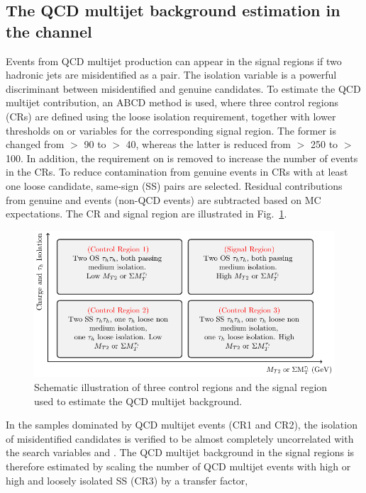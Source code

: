 \subsection{\texorpdfstring{The QCD multijet background estimation in the \tauTau channel}{The QCD multijet background estimation in the tau-tau channel}}
\label{sect:bkgQCD}
Events from QCD multijet production can appear in the signal regions if two hadronic jets are misidentified as a \tauTau pair.
The isolation variable is a powerful discriminant between misidentified and genuine \Tau candidates. To estimate the QCD multijet contribution, an ABCD method is used, where three \tauTau control regions (CRs) are defined using the loose \Tau isolation requirement, together with lower thresholds on \mttwo or \SumMT variables for the corresponding signal region. The former is changed from \mttwo $>$ 90 to $>$ 40\GeV, whereas the latter is reduced from \SumMT $>$ 250 to $>$ 100\GeV. In addition, the requirement on \deltaphi is removed to increase the number of events in the CRs. 
To reduce contamination from genuine \tauTau events 
in CRs with at least one loose \Tau candidate, 
same-sign (SS) \tauTau pairs are selected. Residual contributions from genuine 
\tauTau and \wjets events (non-QCD events) are subtracted based on MC expectations. 
The CR and signal region are illustrated in Fig.~\ref{fig:ABCDQCD}. 
\begin{figure}[!htb]
\centering
\includegraphics[angle=0,scale=1.15]{Bkg/ABCD.pdf}
\caption{Schematic illustration of three control regions and the signal region used to estimate the QCD multijet background.}
\label{fig:ABCDQCD}
\end{figure}
In the samples dominated by QCD multijet events (CR1 and CR2), the isolation of misidentified \Tau candidates is verified 
to be almost completely uncorrelated with the search variables \mttwo and \SumMT.
The QCD multijet background in the signal regions is therefore estimated by scaling the number of QCD multijet events with high \mttwo or high \SumMT and loosely isolated SS \tauTau (CR3) by a transfer factor, 
